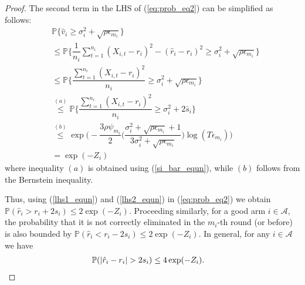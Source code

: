 \begin{proof}
 The second term in the LHS of (\ref{eq:prob_eq2}) can be simplified as follows:
\begin{align}
&\mathbb{P}\bigg\lbrace \hat{v}_{i}\geq \sigma_{i}^{2}+\sqrt{\rho\epsilon_{m_{i}}}\bigg\rbrace\nonumber\\
&\leq \mathbb{P}\bigg\lbrace \dfrac{1}{n_{i}}\sum_{t=1}^{n_{i}}(X_{i,t}-r_{i})^{2}-(\hat{r}_{i}-r_{i})^{2}\geq \sigma_{i}^{2}+\sqrt{\rho\epsilon_{m_{i}}}\bigg\rbrace\nonumber\\
&\leq \mathbb{P}\bigg\lbrace \dfrac{\sum_{t=1}^{n_{i}}(X_{i,t}-r_{i})^{2}}{n_{i}}\geq \sigma_{i}^{2}+\sqrt{\rho\epsilon_{m_{i}}} \bigg\rbrace\nonumber\\
&\overset{(a)}{\leq} \mathbb{P}\bigg\lbrace \dfrac{\sum_{t=1}^{n_{i}}(X_{i,t}-r_{i})^{2}}{n_{i}}\geq \sigma_{i}^{2} + 2\bar{s}_i\bigg\rbrace \nonumber\\
&\overset{(b)}{\leq} \exp\bigg(- \dfrac{3\rho\psi_{m_i}}{2} \bigg(\dfrac{\sigma_{i}^{2}+\sqrt{\rho\epsilon_{m_{i}}}+1}{3\sigma_{i}^{2}+\sqrt{\rho \epsilon_{m_{i}}}}\bigg) \log( T\epsilon_{m_{i}}) \bigg)\nonumber \\
& = \exp(-Z_i)
\label{lhs2_equn}
\end{align}
where inequality $(a)$ is obtained using (\ref{si_bar_equn}), while $(b)$ follows from the Bernstein inequality. 
  
Thus, using (\ref{lhs1_equn}) and (\ref{lhs2_equn}) in (\ref{eq:prob_eq2}) we obtain $\mathbb{P}(\hat{r}_{i}> r_{i} + 2s_{i})\le 2\exp(-Z_i)$.
Proceeding similarly, for a good arm $i\in\mathcal{A}$, the probability that it is not correctly eliminated in the $m_i$-th round (or before) is also bounded by $\mathbb{P}(\hat{r}_{i}< r_{i} - 2s_{i})\le 2\exp(-Z_i)$. In general, for any $i\in\mathcal{A}$ we have
\begin{align}
\Pb(|\hat{r}_i-r_i|>2s_i) 
&\le4\exp(-Z_i).
\label{final_bound_equn}
\end{align}
  

\end{proof}
